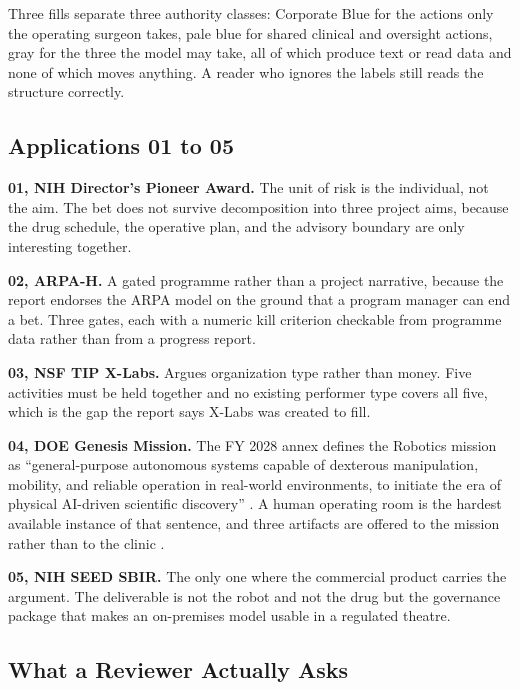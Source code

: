 Three fills separate three authority classes: Corporate Blue for the actions
only the operating surgeon takes, pale blue for shared clinical and oversight
actions, gray for the three the model may take, all of which produce text or
read data and none of which moves anything. A reader who ignores the labels
still reads the structure correctly.

\subsection{Applications 01 to 05}

\textbf{01, NIH Director's Pioneer Award.} The unit of risk is the individual,
not the aim. The bet does not survive decomposition into three project aims,
because the drug schedule, the operative plan, and the advisory boundary are
only interesting together.

\textbf{02, ARPA-H.} A gated programme rather than a project narrative, because
the report endorses the ARPA model on the ground that a program manager can end
a bet. Three gates, each with a numeric kill criterion checkable from programme
data rather than from a progress report.

\textbf{03, NSF TIP X-Labs.} Argues organization type rather than money. Five
activities must be held together and no existing performer type covers all five,
which is the gap the report says X-Labs was created to fill.

\textbf{04, DOE Genesis Mission.} The FY 2028 annex defines the Robotics mission
as ``general-purpose autonomous systems capable of dexterous manipulation,
mobility, and reliable operation in real-world environments, to initiate the era
of physical AI-driven scientific discovery''
\cite{kratsiosvought2026fy2028priorities}. A human operating room is the hardest
available instance of that sentence, and three artifacts are offered to the
mission rather than to the clinic \cite{eo14363genesismission}.

\textbf{05, NIH SEED SBIR.} The only one where the commercial product carries
the argument. The deliverable is not the robot and not the drug but the
governance package that makes an on-premises model usable in a regulated
theatre.

\subsection{What a Reviewer Actually Asks}


